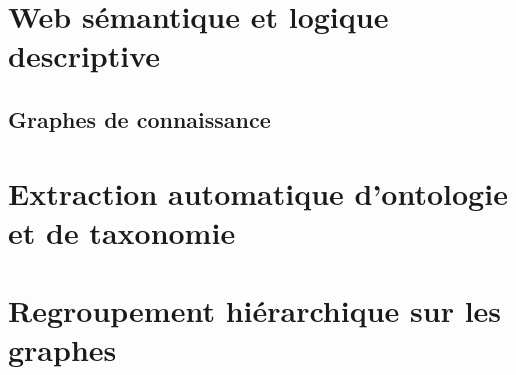\label{chap:revue}
\section{Web sémantique et logique descriptive}
\label{sec:dl}

\subsection{Graphes de connaissance}




\section{Extraction automatique d'ontologie et de taxonomie}

\section{Regroupement hiérarchique sur les graphes}
